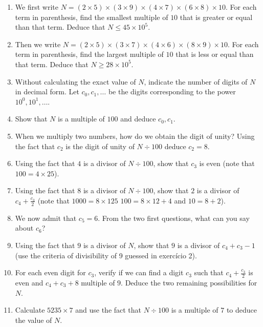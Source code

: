 \begin{enumerate}
\item We first write $N = \left(2 \times 5\right) \times
\left(3 \times 9\right) \times
\left(4 \times 7\right) \times
\left(6 \times 8\right) \times 10$. For each term in parenthesis, find
the smallest multiple of $10$ that is greater or equal than that term.
Deduce that $N \leq 45 \times 10^5$.

\item Then we write $N =
  \left(2 \times 5\right) \times
  \left(3 \times 7\right) \times
  \left(4 \times 6\right) \times
  \left(8 \times 9\right) \times 10$. For each term in parenthesis, find
  the largest multiple of $10$ that is less or equal than that term.
  Deduce that $N \geq 28 \times 10^5$.

\item Without calculating the exact value of $N$, indicate the number of
  digits of $N$ in decimal form. Let $c_0, c_1, \ldots$ be the digits
  corresponding to the power $10^0, 10^1, \ldots$.

\item Show that $N$ is a multiple of $100$ and deduce $c_0, c_1$.

\item When we multiply two numbers, how do we obtain the digit of unity?
  Using the fact that $c_2$ is the digit of unity of $N \div 100$
  deduce $c_2=8$.

\item Using the fact that $4$ is a divisor of $N \div 100$,
  show that $c_3$ is even (note that $100 = 4 \times 25$).

\item Using the fact that $8$ is a divisor of
  $N \div 100$, show that $2$ is a divisor of $c_4+\frac{c_3}{2}$
  (note that $1000=8\times125$ $100=8\times12+4$ and $10=8+2$).

\item We now admit that $c_5=6$. From the two first questions, what can you say
  about $c_6$?

\item Using the fact that $9$ is a divisor of
  $N$, show that $9$ is a divisor of $c_4+c_3-1$ (use the criteria
  of divisibility of 9 guessed in exercício 2).

\item For each even digit for $c_3$, verify if we can find a digit $c_3$
  such that $c_4+\frac{c_3}{2}$ is even and $c_4+c_3+8$ multiple of $9$.
  Deduce the two remaining possibilities for $N$.

\item Calculate $5235 \times 7$ and use the fact that $N \div 100$ is
  a multiple of $7$ to deduce the value of $N$.
\end{enumerate}

